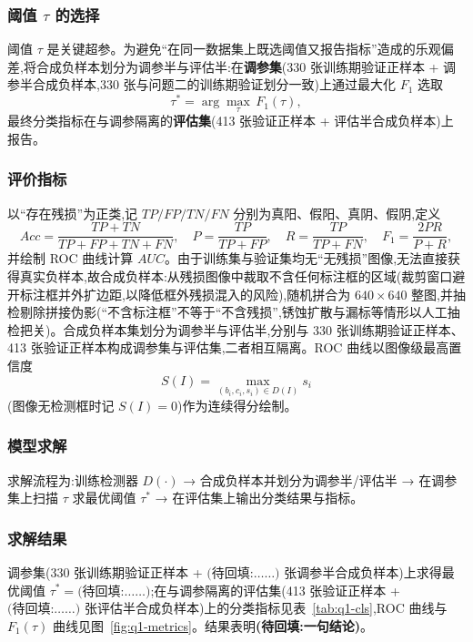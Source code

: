 \subsubsection{阈值 $\tau$ 的选择}

阈值 $\tau$ 是关键超参。为避免“在同一数据集上既选阈值又报告指标”造成的乐观偏差,将合成负样本划分为调参半与评估半:在\textbf{调参集}(330 张训练期验证正样本 + 调参半合成负样本,330 张与问题二的训练期验证划分一致)上通过最大化 $F_1$ 选取
\[
\tau^{*}=\arg\max_{\tau}\, F_1(\tau),
\]
最终分类指标在与调参隔离的\textbf{评估集}(413 张验证正样本 + 评估半合成负样本)上报告。

\subsubsection{评价指标}

以“存在残损”为正类,记 $TP/FP/TN/FN$ 分别为真阳、假阳、真阴、假阴,定义
\[
Acc=\frac{TP+TN}{TP+FP+TN+FN},\quad
P=\frac{TP}{TP+FP},\quad
R=\frac{TP}{TP+FN},\quad
F_1=\frac{2PR}{P+R},
\]
并绘制 ROC 曲线计算 $AUC$。由于训练集与验证集均无“无残损”图像,无法直接获得真实负样本,故合成负样本:从残损图像中裁取不含任何标注框的区域(裁剪窗口避开标注框并外扩边距,以降低框外残损混入的风险),随机拼合为 $640\times640$ 整图,并抽检剔除拼接伪影(“不含标注框”不等于“不含残损”,锈蚀扩散与漏标等情形以人工抽检把关)。合成负样本集划分为调参半与评估半,分别与 330 张训练期验证正样本、413 张验证正样本构成调参集与评估集,二者相互隔离。ROC 曲线以图像级最高置信度
\[
S(I)=\max_{(b_i,c_i,s_i)\in D(I)} s_i
\]
(图像无检测框时记 $S(I)=0$)作为连续得分绘制。

\subsubsection{模型求解}

求解流程为:训练检测器 $D(\cdot)$ → 合成负样本并划分为调参半/评估半 → 在调参集上扫描 $\tau$ 求最优阈值 $\tau^{*}$ → 在评估集上输出分类结果与指标。

\subsubsection{求解结果}

调参集(330 张训练期验证正样本 + $\textbf{(待回填:……)}$ 张调参半合成负样本)上求得最优阈值 $\tau^{*}=\textbf{(待回填:……)}$;在与调参隔离的评估集(413 张验证正样本 + $\textbf{(待回填:……)}$ 张评估半合成负样本)上的分类指标见表~\ref{tab:q1-cls},ROC 曲线与 $F_1(\tau)$ 曲线见图~\ref{fig:q1-metrics}。结果表明\textbf{(待回填:一句结论)}。

